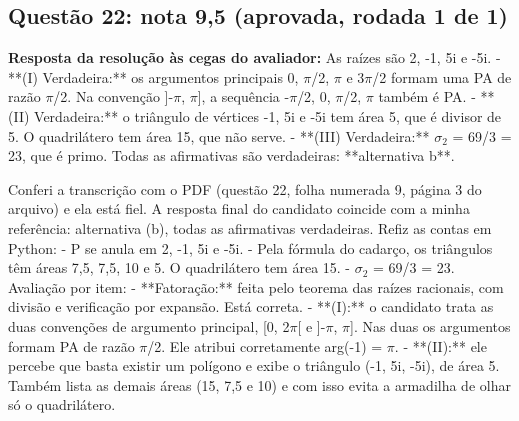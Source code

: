 \documentclass{article}%
\begin{document}
\subsection*{Questão 22: nota 9,5 (aprovada, rodada 1 de 1)}%
\textbf{Resposta da resolução às cegas do avaliador:} As raízes são 2, -1, 5i e -5i.\newline%
{-} **(I) Verdadeira:** os argumentos principais 0, $\pi$/2, $\pi$ e 3$\pi$/2 formam uma PA de razão $\pi$/2. Na convenção {]}-$\pi$, $\pi${]}, a sequência -$\pi$/2, 0, $\pi$/2, $\pi$ também é PA.\newline%
{-} **(II) Verdadeira:** o triângulo de vértices -1, 5i e -5i tem área 5, que é divisor de 5. O quadrilátero tem área 15, que não serve.\newline%
{-} **(III) Verdadeira:** $\sigma$$_{2}$ = 69/3 = 23, que é primo.\newline%
\newline%
Todas as afirmativas são verdadeiras: **alternativa b**.\par %
Conferi a transcrição com o PDF (questão 22, folha numerada 9, página 3 do arquivo) e ela está fiel. A resposta final do candidato coincide com a minha referência: alternativa (b), todas as afirmativas verdadeiras. Refiz as contas em Python:\newline%
{-} P se anula em 2, -1, 5i e -5i.\newline%
{-} Pela fórmula do cadarço, os triângulos têm áreas 7,5, 7,5, 10 e 5. O quadrilátero tem área 15.\newline%
{-} $\sigma$$_{2}$ = 69/3 = 23.\newline%
\newline%
Avaliação por item:\newline%
{-} **Fatoração:** feita pelo teorema das raízes racionais, com divisão e verificação por expansão. Está correta.\newline%
{-} **(I):** o candidato trata as duas convenções de argumento principal, {[}0, 2$\pi${[} e {]}-$\pi$, $\pi${]}. Nas duas os argumentos formam PA de razão $\pi$/2. Ele atribui corretamente arg(-1) = $\pi$.\newline%
{-} **(II):** ele percebe que basta existir um polígono e exibe o triângulo (-1, 5i, -5i), de área 5. Também lista as demais áreas (15, 7,5 e 10) e com isso evita a armadilha de olhar só o quadrilátero.\newline%
\end{document}
